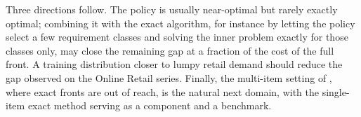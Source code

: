 \documentclass[preprint,12pt,authoryear]{elsarticle}
\begin{document}
Three directions follow. The policy is usually near-optimal but rarely exactly optimal; combining
it with the exact algorithm, for instance by letting the policy select a few requirement classes
and solving the inner problem exactly for those classes only, may close the remaining gap at a
fraction of the cost of the full front. A training distribution closer to lumpy retail demand
should reduce the gap observed on the Online Retail series. Finally, the multi-item setting of
\citet{Kania2024DESMILS}, where exact fronts are out of reach, is the natural next domain, with
the single-item exact method serving as a component and a benchmark.




\end{document}
